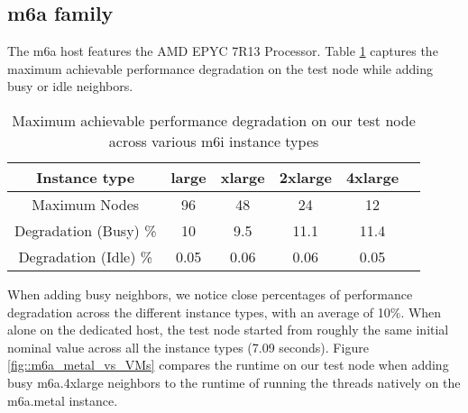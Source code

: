 \subsection{m6a family}
The m6a host features the AMD EPYC 7R13 Processor. Table \ref{tab::max_m6a} captures the maximum 
achievable performance degradation on the test node while adding busy or idle neighbors. 

\begin{table}[H]
\begin{center}
\begin{tabular}{ |c|c|c|c|c|c }
 Instance type & large & xlarge & 2xlarge & 4xlarge \\
 \hline
 Maximum Nodes & 96 & 48 & 24 & 12  \\
 \hline
Degradation (Busy) \% & 10 & 9.5 & 11.1 & 11.4  \\ 
\hline 
Degradation (Idle) \% & 0.05 & 0.06 & 0.06 & 0.05  \\ 
\end{tabular}
\end{center}
\caption{Maximum achievable performance degradation on our test node across various m6i instance types}
\label{tab::max_m6a}
\end{table}
\noindent
When adding busy neighbors, we notice close percentages of performance 
degradation across the different instance types,  with an average of 10\%. 
When alone on the dedicated host, the test node started from roughly the same initial nominal value 
across all the instance types (7.09 seconds). 
Figure \ref{fig::m6a_metal_vs_VMs} compares the runtime on our 
test node when adding busy m6a.4xlarge neighbors to the runtime of running the threads natively on 
the m6a.metal instance. 

